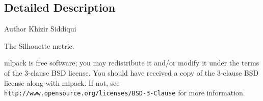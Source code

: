 \subsection{Detailed Description}
\begin{DoxyAuthor}{Author}
Khizir Siddiqui
\end{DoxyAuthor}
The Silhouette metric.

mlpack is free software; you may redistribute it and/or modify it under the terms of the 3-\/clause B\+SD license. You should have received a copy of the 3-\/clause B\+SD license along with mlpack. If not, see {\tt http\+://www.\+opensource.\+org/licenses/\+B\+S\+D-\/3-\/\+Clause} for more information. 